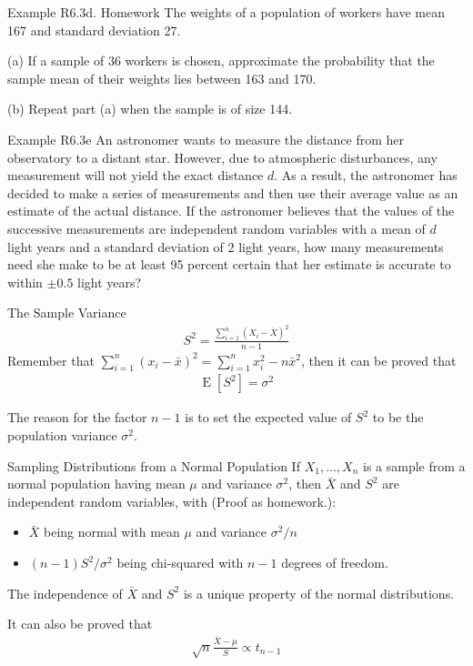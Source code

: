 \documentclass{beamer}
\newcommand{\E}[1]{\operatorname{E}\left[#1\right]}
\begin{document}
\begin{frame}[t,shrink=10]{Example R6.3d. Homework}
  The weights of a population of workers have mean 167 and standard deviation
  27.

  (a) If a sample of 36 workers is chosen, approximate the probability that the
  sample mean of their weights lies between 163 and 170.

  (b) Repeat part (a) when the sample is of size 144.
\end{frame}

\begin{frame}[t,shrink=10]{Example R6.3e}
  An astronomer wants to measure the distance from her observatory to a distant
  star. However, due to atmospheric disturbances, any measurement will not yield
  the exact distance $d$. As a result, the astronomer has decided to make a
  series of measurements and then use their average value as an estimate of the
  actual distance. If the astronomer believes that the values of the successive
  measurements are independent random variables with a mean of $d$ light years
  and a standard deviation of 2 light years, how many measurements need she make
  to be at least 95 percent certain that her estimate is accurate to within
  $\pm 0.5$ light years?
\end{frame}

\begin{frame}{The Sample Variance}
  \begin{align*}
    S^2 = \frac{\sum_{i=1}^n\left(X_i - \bar{X}\right)^2}{n-1}
  \end{align*}
  Remember that
  $\sum_{i=1}^n\left(x_i - \bar{x}\right)^2 = \sum_{i=1}^n x_i^2 - n\bar{x}^2$,
  then it can be proved that
  \begin{align*}
    \E{S^2} = \sigma^2
  \end{align*}

  The reason for the factor $n-1$ is to set the expected value of $S^2$ to be
  the population variance $\sigma^2$.
\end{frame}

\begin{frame}{Sampling Distributions from a Normal Population}
  If $X_1,\ldots,X_n$ is a sample from a normal population having mean $\mu$ and
  variance $\sigma^2$, then $\bar{X}$ and $S^2$ are independent random
  variables, with (Proof as homework.):
\begin{itemize}
\item $\bar{X}$ being normal with mean $\mu$ and variance $\sigma^2/n$
\item $(n-1)S^2/\sigma^2$ being chi-squared with $n-1$ degrees of freedom.
\end{itemize}


  The independence of $\bar{X}$ and $S^2$ is a unique property of the normal
  distributions.

  It can also be proved that
  \begin{align*}
    \sqrt{n}\frac{\bar{X}-\mu}{S}\propto t_{n-1}
  \end{align*}
\end{frame}
\end{document}
